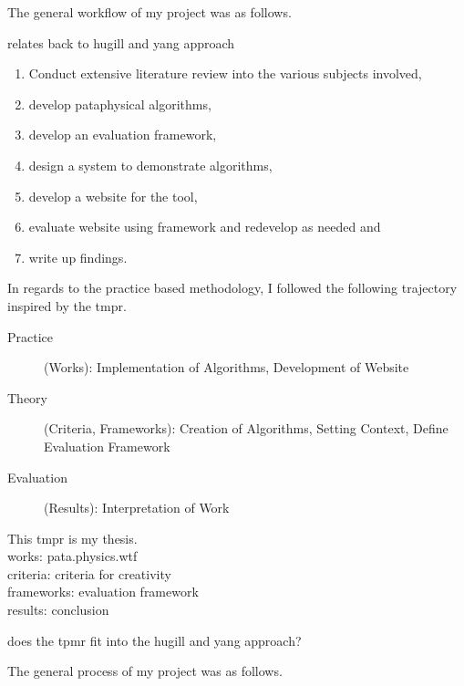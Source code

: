The general workflow of my project was as follows.
\begin{draft}
relates back to hugill and yang approach
\end{draft}

\begin{enumerate}
  \item Conduct extensive literature review into the various subjects involved,
  \item develop pataphysical algorithms,
  \item develop an evaluation framework,
  \item design a system to demonstrate algorithms,
  \item develop a website for the tool,
  \item evaluate website using framework and redevelop as needed and
  \item write up findings.
\end{enumerate}

In regards to the practice based methodology, I followed the following trajectory inspired by the \gls{tmpr}.


\begin{description}
  \item [Practice] (Works): Implementation of Algorithms, Development of Website
  \item [Theory] (Criteria, Frameworks): Creation of Algorithms, Setting Context, Define Evaluation Framework
  \item [Evaluation] (Results): Interpretation of Work
\end{description}

\begin{draft}
  This tmpr is my thesis.\\
  works: pata.physics.wtf\\
  criteria: criteria for creativity\\
  frameworks: evaluation framework\\
  results: conclusion
\end{draft}

\begin{draft}
  does the tpmr fit into the hugill and yang approach?
\end{draft}



The general process of my project was as follows.

